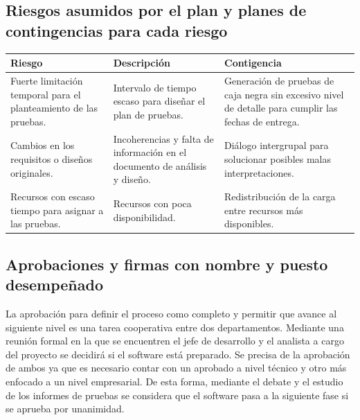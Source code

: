 \documentclass[10pt,a4paper]{article}
\begin{document}
	\subsection{Riesgos asumidos por el plan y planes de contingencias para cada riesgo}
		\begin{table}[htpb]
			\centering
			\label{my-label}
			\begin{tabularx}{\textwidth}{|X|X|X|}
				\hline
				\textbf{Riesgo}                                                  & \textbf{Descripción}                                                       & \textbf{Contigencia}                                                                                  \\ \hline
				Fuerte limitación temporal para el planteamiento de las pruebas. & Intervalo de tiempo escaso para diseñar el plan de pruebas.                & Generación de pruebas de caja negra sin excesivo nivel de detalle para cumplir las fechas de entrega. \\ \hline
				Cambios en los requisitos o diseños originales.                  & Incoherencias y falta de información en el documento de análisis y diseño. & Diálogo intergrupal para solucionar posibles malas interpretaciones.                                  \\ \hline
				Recursos con escaso tiempo para asignar a las pruebas.           & Recursos con poca disponibilidad.                                          & Redistribución de la carga entre recursos más disponibles.                                            \\ \hline
			\end{tabularx}
		\end{table}

	\subsection{Aprobaciones y firmas con nombre y puesto desempeñado}
		La aprobación para definir el proceso como completo y permitir que avance al siguiente nivel es una tarea cooperativa entre dos departamentos. Mediante una reunión formal en la que se encuentren el jefe de desarrollo y el analista a cargo del proyecto se decidirá si el software está preparado. Se precisa de la aprobación de ambos ya que es necesario contar con un aprobado a nivel técnico y otro más enfocado a un nivel empresarial. De esta forma, mediante el debate y el estudio de los informes de pruebas se considera que el software pasa a la siguiente fase si se aprueba por unanimidad.
\end{document}
